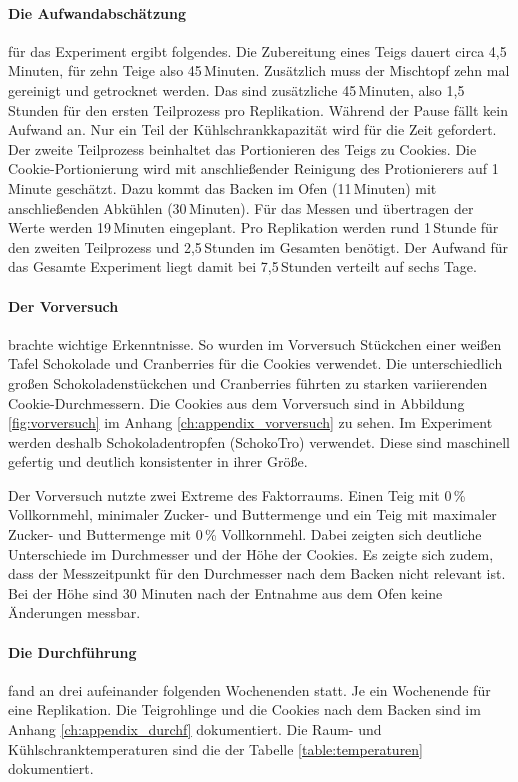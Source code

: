 \paragraph{Die Aufwandabschätzung} für das Experiment ergibt folgendes.
Die Zubereitung eines Teigs dauert circa 4,5\,Minuten, für zehn Teige also 45\,Minuten.
Zusätzlich muss der Mischtopf zehn mal gereinigt und getrocknet werden.
Das sind zusätzliche 45\,Minuten, also 1,5\,Stunden für den ersten Teilprozess pro Replikation.
Während der Pause fällt kein Aufwand an.
Nur ein Teil der Kühlschrankkapazität wird für die Zeit gefordert.
Der zweite Teilprozess beinhaltet das Portionieren des Teigs zu Cookies.
Die Cookie-Portionierung wird mit anschließender Reinigung des Protionierers auf 1\,Minute geschätzt.
Dazu kommt das Backen im Ofen (11\,Minuten) mit anschließenden Abkühlen (30\,Minuten).
Für das Messen und übertragen der Werte werden 19\,Minuten eingeplant.
Pro Replikation werden rund 1\,Stunde für den zweiten Teilprozess und 2,5\,Stunden im Gesamten benötigt.
Der Aufwand für das Gesamte Experiment liegt damit bei 7,5\,Stunden verteilt auf sechs Tage.

\paragraph{Der Vorversuch} brachte wichtige Erkenntnisse. 
So wurden im Vorversuch Stückchen einer weißen Tafel Schokolade und Cranberries für die Cookies verwendet.
Die unterschiedlich großen Schokoladenstückchen und Cranberries führten zu starken variierenden Cookie-Durchmessern.
Die Cookies aus dem Vorversuch sind in Abbildung \ref{fig:vorversuch} im Anhang \ref{ch:appendix_vorversuch} zu sehen.
Im Experiment werden deshalb Schokoladentropfen (SchokoTro) verwendet.
Diese sind maschinell gefertig und deutlich konsistenter in ihrer Größe.

Der Vorversuch nutzte zwei Extreme des Faktorraums.
Einen Teig mit 0\,\% Vollkornmehl, minimaler Zucker- und Buttermenge und ein Teig mit maximaler Zucker- und Buttermenge mit 0\,\% Vollkornmehl.
Dabei zeigten sich deutliche Unterschiede im Durchmesser und der Höhe der Cookies.
Es zeigte sich zudem, dass der Messzeitpunkt für den Durchmesser nach dem Backen nicht relevant ist.
Bei der Höhe sind 30 Minuten nach der Entnahme aus dem Ofen keine Änderungen messbar.

\paragraph{Die Durchführung} fand an drei aufeinander folgenden Wochenenden statt.
Je ein Wochenende für eine Replikation.
Die Teigrohlinge und die Cookies nach dem Backen sind im Anhang \ref{ch:appendix_durchf} dokumentiert.
Die Raum- und Kühlschranktemperaturen sind die der Tabelle \ref{table:temperaturen} dokumentiert.

